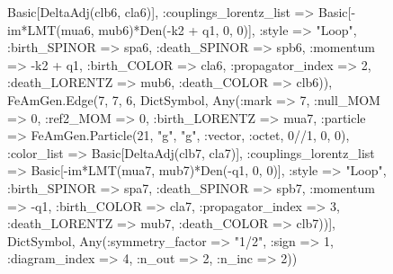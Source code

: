 \documentclass{revtex4}
\begin{document}
\begin{figure}[!htb]
\begin{center}
{Basic[DeltaAdj(clb6, cla6)], :couplings_lorentz_list => Basic[-im*LMT(mua6, mub6)*Den(-k2 + q1, 0, 0)], :style => "Loop", :birth_SPINOR => spa6, :death_SPINOR => spb6, :momentum => -k2 + q1, :birth_COLOR => cla6, :propagator_index => 2, :death_LORENTZ => mub6, :death_COLOR => clb6)), FeAmGen.Edge(7, 7, 6, Dict{Symbol, Any}(:mark => 7, :null_MOM => 0, :ref2_MOM => 0, :birth_LORENTZ => mua7, :particle => FeAmGen.Particle(21, "g", "g", :vector, :octet, 0//1, 0, 0), :color_list => Basic[DeltaAdj(clb7, cla7)], :couplings_lorentz_list => Basic[-im*LMT(mua7, mub7)*Den(-q1, 0, 0)], :style => "Loop", :birth_SPINOR => spa7, :death_SPINOR => spb7, :momentum => -q1, :birth_COLOR => cla7, :propagator_index => 3, :death_LORENTZ => mub7, :death_COLOR => clb7))], Dict{Symbol, Any}(:symmetry_factor => "1/2", :sign => 1, :diagram_index => 4, :n_out => 2, :n_inc => 2)) 
}
\end{center}
\end{figure}
\end{document}
